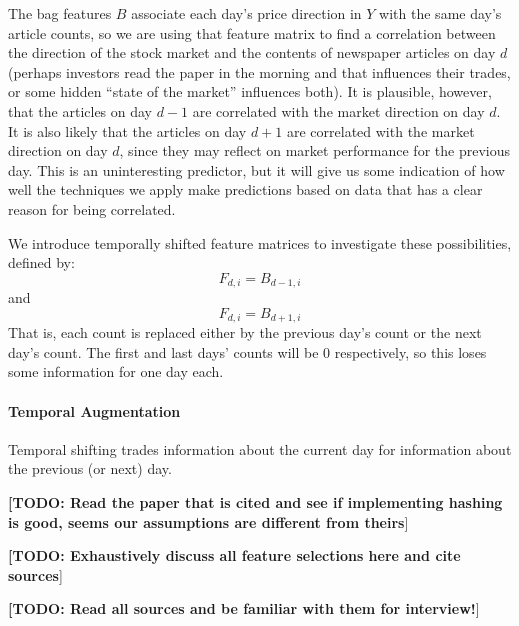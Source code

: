 \documentclass[10pt]{scrartcl}
\def\TODO#1{\noindent\textbf{[TODO: #1}]}
\begin{document}
The bag features $B$ associate each day's price direction in $Y$ with the same day's article counts, so we are using that feature matrix to find a correlation between the direction of the stock market and the contents of newspaper articles on day $d$ (perhaps investors read the paper in the morning and that influences their trades, or some hidden ``state of the market'' influences both). It is plausible, however, that the articles on day $d-1$ are correlated with the market direction on day $d$. It is also likely that the articles on day $d+1$ are correlated with the market direction on day $d$, since they may reflect on market performance for the previous day. This is an uninteresting predictor, but it will give us some indication of how well the techniques we apply make predictions based on data that has a clear reason for being correlated.

We introduce temporally shifted feature matrices to investigate these possibilities, defined by: $$F_{d,i} = B_{d-1,i}$$ and $$F_{d,i} = B_{d+1,i}$$ That is, each count is replaced either by the previous day's count or the next day's count. The first and last days' counts will be 0 respectively, so this loses some information for one day each.

\paragraph{Temporal Augmentation}

Temporal shifting trades information about the current day for information about the previous (or next) day.




 
\TODO{Read the paper that is cited and see if implementing hashing is good, seems our assumptions are different from theirs}

\TODO{Exhaustively discuss all feature selections here and cite sources}

\TODO{Read all sources and be familiar with them for interview!}
 
\end{document}

